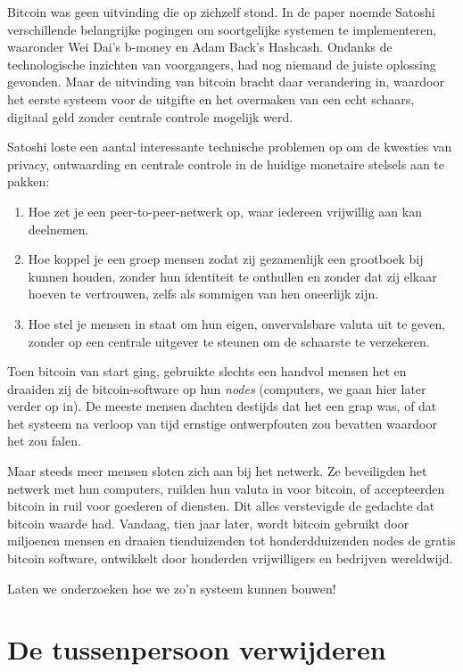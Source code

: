 \documentclass[
  letterpaper,
]{scrbook}
\begin{document}
Bitcoin was geen uitvinding die op zichzelf stond. In de paper noemde
Satoshi verschillende belangrijke pogingen om soortgelijke systemen te
implementeren, waaronder Wei Dai's b-money en Adam Back's Hashcash.
Ondanks de technologische inzichten van voorgangers, had nog niemand de
juiste oplossing gevonden. Maar de uitvinding van bitcoin bracht daar
verandering in, waardoor het eerste systeem voor de uitgifte en het
overmaken van een echt schaars, digitaal geld zonder centrale controle
mogelijk werd.

Satoshi loste een aantal interessante technische problemen op om de
kwesties van privacy, ontwaarding en centrale controle in de huidige
monetaire stelsels aan te pakken:

\begin{enumerate}
\def\labelenumi{\arabic{enumi}.}
\item
  Hoe zet je een peer-to-peer-netwerk op, waar iedereen vrijwillig aan
  kan deelnemen.
\item
  Hoe koppel je een groep mensen zodat zij gezamenlijk een grootboek bij
  kunnen houden, zonder hun identiteit te onthullen en zonder dat zij
  elkaar hoeven te vertrouwen, zelfs als sommigen van hen oneerlijk
  zijn.
\item
  Hoe stel je mensen in staat om hun eigen, onvervalsbare valuta uit te
  geven, zonder op een centrale uitgever te steunen om de schaarste te
  verzekeren.
\end{enumerate}

Toen bitcoin van start ging, gebruikte slechts een handvol mensen het en
draaiden zij de bitcoin-software op hun \emph{nodes} (computers, we gaan
hier later verder op in). De meeste mensen dachten destijds dat het een
grap was, of dat het systeem na verloop van tijd ernstige ontwerpfouten
zou bevatten waardoor het zou falen.

Maar steeds meer mensen sloten zich aan bij het netwerk. Ze beveiligden
het netwerk met hun computers, ruilden hun valuta in voor bitcoin, of
accepteerden bitcoin in ruil voor goederen of diensten. Dit alles
verstevigde de gedachte dat bitcoin waarde had. Vandaag, tien jaar
later, wordt bitcoin gebruikt door miljoenen mensen en draaien
tienduizenden tot honderdduizenden nodes de gratis bitcoin software,
ontwikkelt door honderden vrijwilligers en bedrijven wereldwijd.

Laten we onderzoeken hoe we zo'n systeem kunnen bouwen!

\hypertarget{de-tussenpersoon-verwijderen}{%
\chapter{De tussenpersoon
verwijderen}\label{de-tussenpersoon-verwijderen}}
\end{document}
